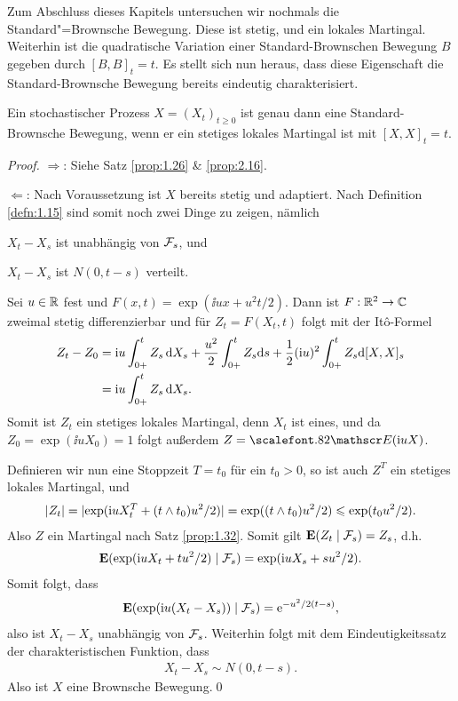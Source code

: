 Zum Abschluss dieses Kapitels untersuchen wir nochmals die Standard"=Brownsche
Bewegung. Diese ist stetig, und ein lokales Martingal. Weiterhin ist die
quadratische Variation einer Standard-Brownschen
Bewegung $B$ gegeben durch $[B,B]_t = t$. Es stellt sich nun heraus, dass diese
Eigenschaft die Standard-Brownsche Bewegung bereits eindeutig charakterisiert.

\begin{theorem}
\label{prop:2.26}
  Ein stochastischer Prozess $X=(X_t)_{t \ge 0}$ ist genau dann eine
  Standard-Brownsche Bewegung, wenn er ein stetiges lokales Martingal ist mit
  $[X,X]_t=t$.\fish
\end{theorem}
\begin{proof}
$\Rightarrow$: Siehe Satz \ref{prop:1.26} \& \ref{prop:2.16}.

$\Leftarrow$: Nach Voraussetzung ist $X$ bereits stetig und adaptiert. Nach
Definition \ref{defn:1.15} sind somit noch zwei Dinge zu zeigen, nämlich
\begin{defnenum}
  \item $X_t-X_s$ ist unabhängig von $\mathcal{F}_s$, und
  \item $X_t - X_s$ ist $N(0,t-s)$ verteilt.
\end{defnenum}

Sei $u\in\mathbb{R}$ fest und $F(x,t) = \exp(\ii ux + u^2t/2)$. Dann ist $F:\mathbb{R}^2\to \mathbb{C}$
zweimal stetig differenzierbar und für $Z_t = F(X_t,t)$ folgt mit der Itô-Formel
\begin{align*}
Z_t-Z_0 &= \mathrm{i} u\int_{0+}^t  Z_{s} \,\mathrm{d} X_s
+ \frac{u^2}{2}\int_{0+}^t  Z_{s} \mathrm{d} s
+ \frac{1}{2}(\mathrm{i} u)^2 \int_{0+}^t Z_s \mathrm{d}[X,X]_s\\
&= \mathrm{i} u\int_{0+}^t  Z_{s} \,\mathrm{d} X_s.
\end{align*}
Somit ist $Z_t$ ein stetiges lokales Martingal, denn $X_t$ ist eines, und da
$Z_0 = \exp(\ii u X_0) = 1$ folgt außerdem $Z = \Ep(\ii uX)$.

Definieren wir nun eine Stoppzeit $T=t_0$ für ein $t_0 > 0$, so ist auch $Z^T$
ein stetiges lokales Martingal, und
\begin{align*}
\lvert Z_t\rvert = \lvert\exp(\mathrm{i} u X_t^T + (t\wedge t_0)u^2/2)\rvert
= \exp((t\wedge t_0) u^2/2 ) \leqslant \exp( t_0 u^2/2).
\end{align*}
Also $Z$ ein Martingal nach Satz \ref{prop:1.32}. Somit gilt $\mathbf{E}(Z_t\mid\mathcal{F}_s)
= Z_s$, d.h.
\begin{align*}
\mathbf{E}(\exp(\mathrm{i} uX_t + tu^2/2)\mid\mathcal{F}_s) = 
\exp(\mathrm{i} uX_s + su^2/2).
\end{align*}
Somit folgt, dass
\begin{align*}
\mathbf{E}(\exp(\mathrm{i} u(X_t-X_s))\mid\mathcal{F}_s) = \mathrm{e}^{-u^2/2(t-s)},
\end{align*}
also ist $X_t-X_s$ unabhängig von $\mathcal{F}_s$. Weiterhin folgt mit dem
Eindeutigkeitssatz der charakteristischen Funktion, dass
\begin{align*}
X_t - X_s \sim N(0,t-s).
\end{align*}
Also ist $X$ eine Brownsche Bewegung.\qed
\end{proof}

